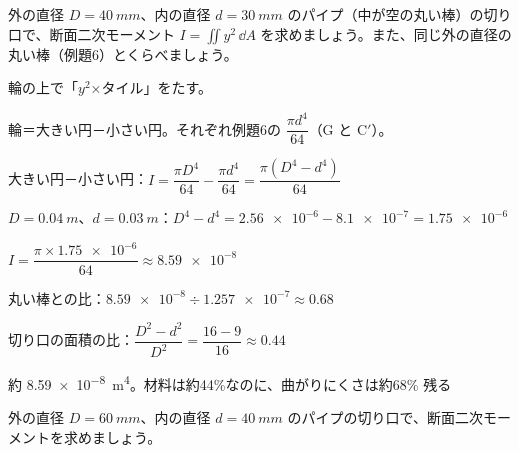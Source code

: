 \begin{reidai}[パイプの断面二次モーメント]
外の直径 $D=\qty{40}{mm}$、内の直径 $d=\qty{30}{mm}$ のパイプ（中が空の丸い棒）の切り口で、断面二次モーメント $I=\iint y^2\,\dd A$ を求めましょう。また、同じ外の直径の丸い棒（例題6）とくらべましょう。\par
\kangaekata {}\par
{}\enspace 輪の上で「$y^2$×タイル」をたす。\par
{}\enspace 輪＝大きい円－小さい円。それぞれ例題6の $\dfrac{\pi d^4}{64}$（G と C$'$）。\par
\shiki\kviiigs{}\zw{} 大きい円－小さい円：$\displaystyle I=\dfrac{\pi D^4}{64}-\dfrac{\pi d^4}{64}=\dfrac{\pi(D^4-d^4)}{64}$\par
\kviiiga $D=\qty{0.04}{m}$、$d=\qty{0.03}{m}$：$\displaystyle D^4-d^4=\num{2.56e-6}-\num{8.1e-7}=\num{1.75e-6}$\par
\kviiiga $\displaystyle I=\dfrac{\pi\times\num{1.75e-6}}{64}\approx\num{8.59e-8}$\par
\kviiiga 丸い棒との比：$\displaystyle \num{8.59e-8}\div\num{1.257e-7}\approx0.68$\par
\kviiiga 切り口の面積の比：$\displaystyle \dfrac{D^2-d^2}{D^2}=\dfrac{16-9}{16}\approx0.44$\par
\kotae 約 \qty{8.59e-8}{m^4}。材料は約44\%なのに、曲がりにくさは約68\% 残る
\end{reidai}

\begin{jibun}
外の直径 $D=\qty{60}{mm}$、内の直径 $d=\qty{40}{mm}$ のパイプの切り口で、断面二次モーメントを求めましょう。
\end{jibun}

